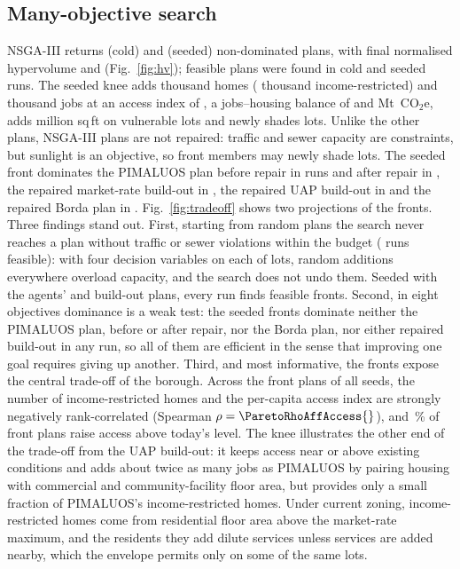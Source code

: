 \documentclass[preprint,12pt]{elsarticle}
\newcommand{\cotwo}{CO$_2$e}
\begin{document}
\subsection{Many-objective search}
NSGA-III returns \ParetoNCold{} (cold) and \ParetoNSeeded{} (seeded) non-dominated plans, with final normalised hypervolume \HVCold{} and \HVSeeded{} (Fig.~\ref{fig:hv}); feasible plans were found in \ParetoColdFeasible{} cold and \ParetoSeededFeasible{} seeded runs. The seeded knee adds \KneeHomesK{} thousand homes (\KneeAffHomesK{} thousand income-restricted) and \KneeJobsK{} thousand jobs at an access index of \KneeAccess{}, a jobs--housing balance of \KneeJH{} and \KneeCarbonMt{} Mt~\cotwo{}, adds \KneeVulnM{} million sq\,ft on vulnerable lots and newly shades \KneeShaded{} lots. Unlike the other plans, NSGA-III plans are not repaired: traffic and sewer capacity are constraints, but sunlight is an objective, so front members may newly shade lots. The seeded front dominates the PIMALUOS plan before repair in \ParetoDomPim{} runs and after repair in \ParetoDomPimVer{}, the repaired market-rate build-out in \ParetoDomBoMktVer{}, the repaired UAP build-out in \ParetoDomBoUapVer{} and the repaired Borda plan in \ParetoDomBordaVer{}. Fig.~\ref{fig:tradeoff} shows two projections of the fronts.
Three findings stand out. First, starting from random plans the search never reaches a plan without traffic or sewer violations within the budget (\ParetoColdFeasible{} runs feasible): with four decision variables on each of \NParcels{} lots, random additions everywhere overload capacity, and the search does not undo them. Seeded with the agents' and build-out plans, every run finds feasible fronts. Second, in eight objectives dominance is a weak test: the seeded fronts dominate neither the PIMALUOS plan, before or after repair, nor the Borda plan, nor either repaired build-out in any run, so all of them are efficient in the sense that improving one goal requires giving up another. Third, and most informative, the fronts expose the central trade-off of the borough. Across the \ParetoNSeededTotal{} front plans of all seeds, the number of income-restricted homes and the per-capita access index are strongly negatively rank-correlated (Spearman $\rho=\ParetoRhoAffAccess{}$), and \ParetoShareAccessAboveBase{}\,\% of front plans raise access above today's level. The knee illustrates the other end of the trade-off from the UAP build-out: it keeps access near or above existing conditions and adds about twice as many jobs as PIMALUOS by pairing housing with commercial and community-facility floor area, but provides only a small fraction of PIMALUOS's income-restricted homes. Under current zoning, income-restricted homes come from residential floor area above the market-rate maximum, and the residents they add dilute services unless services are added nearby, which the envelope permits only on some of the same lots.
\end{document}
